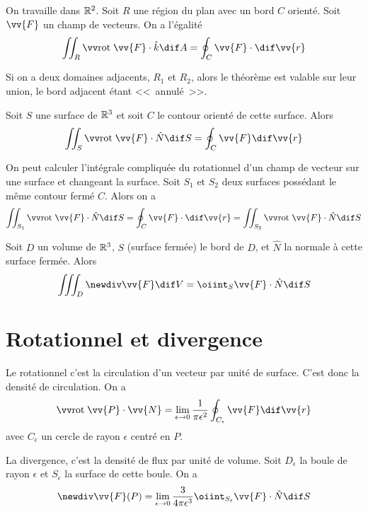 \begin{mytheo}
	On travaille dans $\mathbb{R}^2$. Soit $R$ une région du plan avec un bord $C$ orienté. Soit $\vv{F}$ un champ de vecteurs. On a l'égalité
	\[ \iint_R \rot \vv{F} \cdot \hat{k} \dif A = \oint_C \vv{F} \cdot \dif \vv{r} \]
\end{mytheo}

\begin{myrem}
	Si on a deux domaines adjacents, $R_1$ et $R_2$, alors le théorème est valable sur leur union, le bord adjacent étant <<~annulé~>>.
\end{myrem}

\begin{mytheo}
	Soit $S$ une surface de $\mathbb{R}^3$ et soit $C$ le contour orienté de cette surface. Alors
	\[ \iint_S \rot \vv{F} \cdot \hat{N} \dif S = \oint_C \vv{F} \dif \vv{r} \]
\end{mytheo}

\begin{myprop}
	On peut calculer l'intégrale compliquée du rotationnel d'un champ de vecteur sur une surface et changeant la surface. Soit $S_1$ et $S_2$ deux surfaces possédant le même contour fermé $C$. Alors on a
	\[ \iint_{S_1} \rot \vv{F} \cdot \hat{N} \dif S = \oint_C \vv{F} \cdot \dif \vv{r} = \iint_{S_2} \rot \vv{F} \cdot \hat{N} \dif S \]
\end{myprop}

\begin{mytheo}
	Soit $D$ un volume de $\mathbb{R}^3$, $S$ (surface fermée) le bord de $D$, et $\hat{N}$ la normale à cette surface fermée. Alors
	\[ \iiint_D \newdiv \vv{F} \dif V = \oiint_S \vv{F} \cdot \hat{N} \dif S \]
\end{mytheo}

\section{Rotationnel et divergence}

\begin{myprop}[Rotationnel]
	Le rotationnel c'est la circulation d'un vecteur par unité de surface. C'est donc la densité de circulation. On a
	\[ \rot \vv{P} \cdot \vv{N} = \lim_{\epsilon \to 0} \frac 1{\pi \epsilon^2} \oint_{C_\epsilon} \vv{F} \dif \vv{r} \]
	avec $C_\epsilon$ un cercle de rayon $\epsilon$ centré en $P$.
\end{myprop}

\begin{myprop}[Divergence]
	La divergence, c'est la densité de flux par unité de volume. Soit $D_{\epsilon}$ la boule de rayon $\epsilon$ et $S_{\epsilon}$ la surface de cette boule. On a
	\[ \newdiv \vv{F}(P) = \lim_{\epsilon \to 0} \frac{3}{4 \pi \epsilon^3} \oiint_{S_{\epsilon}} \vv{F} \cdot \hat{N} \dif S \]
\end{myprop}


